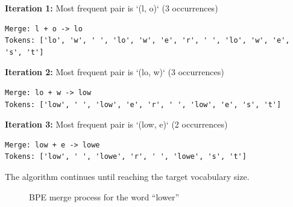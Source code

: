 \textbf{Iteration 1:} Most frequent pair is `(l, o)` (3 occurrences)
\begin{lstlisting}[style=shell, numbers=none]
Merge: l + o -> lo
Tokens: ['lo', 'w', ' ', 'lo', 'w', 'e', 'r', ' ', 'lo', 'w', 'e', 's', 't']
\end{lstlisting}

\textbf{Iteration 2:} Most frequent pair is `(lo, w)` (3 occurrences)
\begin{lstlisting}[style=shell, numbers=none]
Merge: lo + w -> low
Tokens: ['low', ' ', 'low', 'e', 'r', ' ', 'low', 'e', 's', 't']
\end{lstlisting}

\textbf{Iteration 3:} Most frequent pair is `(low, e)` (2 occurrences)
\begin{lstlisting}[style=shell, numbers=none]
Merge: low + e -> lowe
Tokens: ['low', ' ', 'lowe', 'r', ' ', 'lowe', 's', 't']
\end{lstlisting}

The algorithm continues until reaching the target vocabulary size.

\begin{figure}[H]
\centering
{}
\caption{BPE merge process for the word ``lower''}
\label{fig:bpe-merges}
\end{figure}

